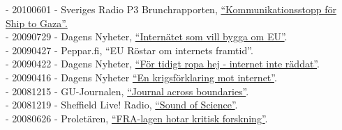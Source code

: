 \documentclass[a4paper,11pt,oneside]{article}
\begin{document}
    - 20100601 - Sveriges Radio P3 Brunchrapporten, \href{http://t.sr.se/1cnEijY}{``Kommunikationsstopp för Ship to Gaza''.} \\
    - 20090729 - Dagens Nyheter, \href{http://www.dn.se/kultur-noje/nyheter/internatet-som-vill-bygga-om-eu/}{``Internätet som vill bygga om EU''}. \\
    - 20090427 - Peppar.fi, ``EU Röstar om internets framtid''. \\
    - 20090422 - Dagens Nyheter, \href{http://www.dn.se/kultur-noje/musik/for-tidigt-ropa-hej-internet-inte-raddat/}{``För tidigt ropa hej - internet inte räddat''}. \\
    - 20090416 - Dagens Nyheter \href{http://www.dn.se/kultur-noje/en-krigsforklaring-mot-internet/}{``En krigsförklaring mot internet''}. \\
    - 20081215 - GU-Journalen, \href{http://www.gu-journalen.gu.se/english/News/News_detail/?contentId=855527}{``Journal across boundaries''}. \\
    - 20081219 - Sheffield Live! Radio, \href{http://www.dcs.shef.ac.uk/%7Enoel/soundofscience/Prog%2032.mp3}{``Sound of Science''}. \\
    - 20080626 - Proletären, \href{http://www.proletaren.se/inrikes/%E2%80%9Dfra-lagen-hotar-kritisk-forskning}{``FRA-lagen hotar kritisk forskning''}.
\end{document}
